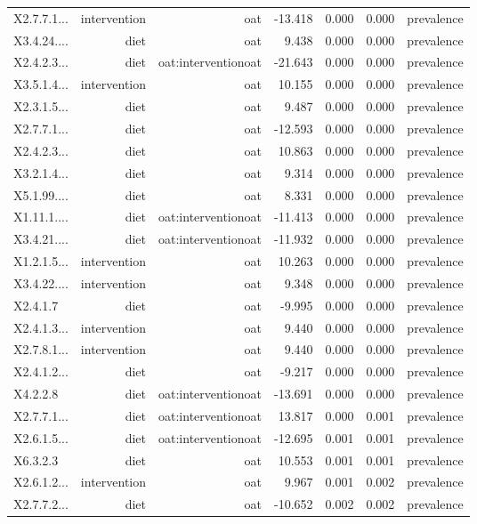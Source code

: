 \documentclass[
]{article}
\begin{document}
\begin{longtable}[t]{lrrrrrr}
X2.7.7.1... & intervention & oat & -13.418 & 0.000 & 0.000 & prevalence\\
X3.4.24.... & diet & oat & 9.438 & 0.000 & 0.000 & prevalence\\
X2.4.2.3... & diet & oat:interventionoat & -21.643 & 0.000 & 0.000 & prevalence\\
\addlinespace
X3.5.1.4... & intervention & oat & 10.155 & 0.000 & 0.000 & prevalence\\
X2.3.1.5... & diet & oat & 9.487 & 0.000 & 0.000 & prevalence\\
X2.7.7.1... & diet & oat & -12.593 & 0.000 & 0.000 & prevalence\\
X2.4.2.3... & diet & oat & 10.863 & 0.000 & 0.000 & prevalence\\
X3.2.1.4... & diet & oat & 9.314 & 0.000 & 0.000 & prevalence\\
\addlinespace
X5.1.99.... & diet & oat & 8.331 & 0.000 & 0.000 & prevalence\\
X1.11.1.... & diet & oat:interventionoat & -11.413 & 0.000 & 0.000 & prevalence\\
X3.4.21.... & diet & oat:interventionoat & -11.932 & 0.000 & 0.000 & prevalence\\
X1.2.1.5... & intervention & oat & 10.263 & 0.000 & 0.000 & prevalence\\
X3.4.22.... & intervention & oat & 9.348 & 0.000 & 0.000 & prevalence\\
\addlinespace
X2.4.1.7 & diet & oat & -9.995 & 0.000 & 0.000 & prevalence\\
X2.4.1.3... & intervention & oat & 9.440 & 0.000 & 0.000 & prevalence\\
X2.7.8.1... & intervention & oat & 9.440 & 0.000 & 0.000 & prevalence\\
X2.4.1.2... & diet & oat & -9.217 & 0.000 & 0.000 & prevalence\\
X4.2.2.8 & diet & oat:interventionoat & -13.691 & 0.000 & 0.000 & prevalence\\
\addlinespace
X2.7.7.1... & diet & oat:interventionoat & 13.817 & 0.000 & 0.001 & prevalence\\
X2.6.1.5... & diet & oat:interventionoat & -12.695 & 0.001 & 0.001 & prevalence\\
X6.3.2.3 & diet & oat & 10.553 & 0.001 & 0.001 & prevalence\\
X2.6.1.2... & intervention & oat & 9.967 & 0.001 & 0.002 & prevalence\\
X2.7.7.2... & diet & oat & -10.652 & 0.002 & 0.002 & \vphantom{1} prevalence\\

\end{longtable}
\end{document}
